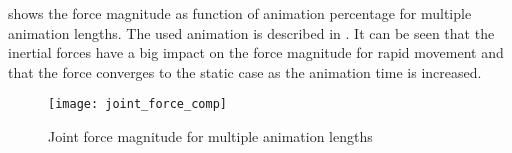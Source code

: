  shows the force magnitude as function of animation percentage for multiple animation lengths. The used animation is described in . It can be seen that the inertial forces have a big impact on the force magnitude for rapid movement and that the force converges to the static case as the animation time is increased.


\begin{figure}[h!]
    \centering
    \texttt{[image: joint\_force\_comp]}
    \caption{Joint force magnitude for multiple animation lengths}
    \label{results}
\end{figure}
